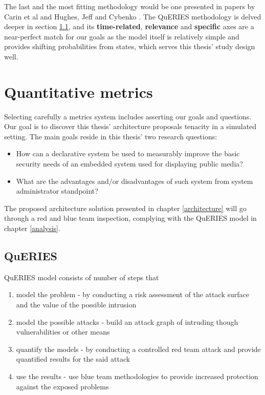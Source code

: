 The last and the most fitting methodology would be one presented in
papers by Carin et al and Hughes, Jeff and Cybenko
\cite{carin2008cybersecurity, hughes2013quantitative}. The
QuERIES methodology is delved deeper in section \ref{queries}, and
its \textbf{time-related}, \textbf{relevance} and \textbf{specific}
axes are a near-perfect match for our goals as the model itself is
relatively simple and provides shifting probabilities from states,
which serves this thesis' study design well.

\section{Quantitative metrics} \label{quantitativemetrics}

Selecting carefully a metrics system includes asserting our goals and
questions. Our goal is to discover this thesis' architecture proposals
tenacity in a simulated setting. The main goals reside in this thesis'
two research questions:

\begin{itemize}
\item How can a declarative system be used to measurably improve the basic
  security needs of an embedded system used for displaying public
  media?
\item What are the advantages and/or disadvantages of such system from
  system administrator standpoint?
\end{itemize}

The proposed architecture solution presented in chapter
\ref{architecture} will go through a red and blue team inspection,
complying with the QuERIES model in chapter \ref{analysis}.

\subsection{QuERIES} \label{queries}
QuERIES model consists of number of steps that

\begin{enumerate}
  \item model the problem - by conducting a risk assessment of the
    attack surface and the value of the possible intrusion
  \item model the possible attacks - build an attack graph of
    intruding though vulnerabilities or other means
  \item quantify the models - by conducting a controlled red team
    attack and provide quantified results for the said attack
  \item use the results - use blue team methodologies to provide
    increased protection against the exposed problems
  
\end{enumerate}

